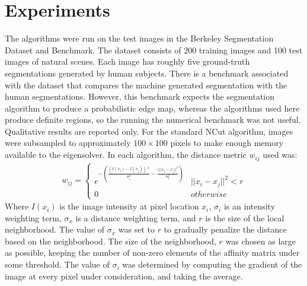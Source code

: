 \documentclass{article}
\begin{document}
\section{Experiments}
The algorithms were run on the test images in the Berkeley Segmentation Dataset and Benchmark\cite{MartinFTM01}. 
The dataset consists of 200 training images and 100 test images of natural scenes.  Each image
has roughly five ground-truth segmentations generated by human subjects.  There is a benchmark associated with the
dataset that compares the machine generated segmentation with the human segmentations.  However, this benchmark
expects the segmentation algorithm to produce a probabilistic edge map, whereas the algorithms used here produce definite regions, so the running the numerical benchmark was not useful.  Qualitative results are reported only.
For the standard NCut algorithm, images were subsampled to approximately $100\times100$ pixels to make
enough memory available to the eigensolver. In each algorithm, the distance metric $w_{ij}$ used was:
\begin{eqnarray*}
	w_{ij} = \left\{\begin{array}{ll}
	    e^{-\left(\frac{(I(x_i) - I(x_j)).^2}{\sigma_i^2} - \frac{(|| x_i - x_j ||^2}{\sigma_x^2}\right) } & ||x_i-x_j||^2 < r \\
		0 & otherwise
	\end{array}\right.
\end{eqnarray*}
Where $I(x_i)$ is the image intensity at pixel location $x_i$, $\sigma_i$ is an intensity weighting term, $\sigma_x$ is a distance weighting term, and $r$ is the size of the local neighborhood.  The value of $\sigma_x$ was set to $r$ to gradually penalize the distance based on the neighborhood.  The size of the neighborhood, $r$ was chosen as large as possible, keeping the number of non-zero elements of the affinity matrix under some threshold.  The value of $\sigma_i$ was determined by computing the gradient of the image at every pixel under consideration, and taking the average.
% 
\end{document}
